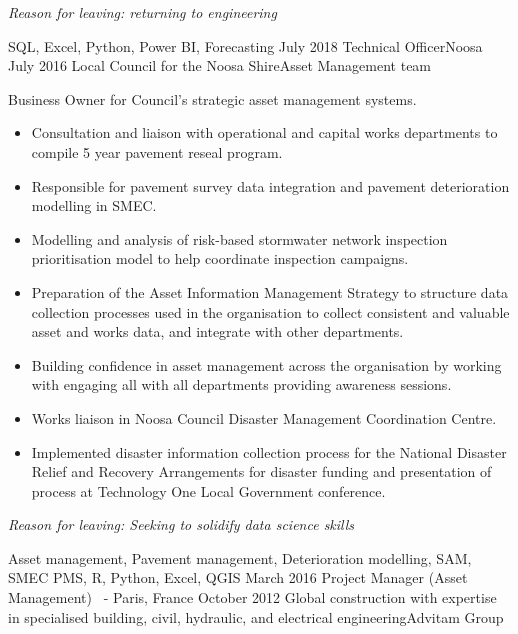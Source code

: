 \begin{experiences}
{\begin{itemize}
                      \end{itemize}
                     \textit{Reason for leaving: returning to engineering}  
                    }
                    {SQL, Excel, Python, Power BI, Forecasting}
  \emptySeparator
  \consultantexperience
    {July 2018} {Technical Officer}{}{Noosa}
    {July 2016}   {Local Council for the Noosa Shire}{Asset Management team}
      {Business Owner for Council's strategic asset management systems.
                      \begin{itemize}
		\item Consultation and liaison with operational and capital works departments to compile 5 year pavement reseal program.
		\item Responsible for pavement survey data integration and pavement deterioration modelling in SMEC.
		\item Modelling and analysis of risk-based stormwater network inspection prioritisation model to help coordinate inspection campaigns.
		\item Preparation of the Asset Information Management Strategy to structure data collection processes used in the organisation to collect consistent and valuable asset and works data, and integrate with other departments.
		\item Building confidence in asset management across the organisation by working with engaging all with all departments providing awareness sessions.
		\item Works liaison in Noosa Council Disaster Management Coordination Centre.
		\item Implemented disaster information collection process for the National Disaster Relief and Recovery Arrangements for disaster funding and presentation of process at Technology One Local Government conference.                                
                      \end{itemize}
                       \textit{Reason for leaving: Seeking to solidify data science skills}
                    }
                    {Asset management, Pavement management, Deterioration modelling, SAM, SMEC PMS, R, Python, Excel, QGIS}
  \emptySeparator
  \consultantexperience
    {March 2016}     {Project Manager (Asset Management)}{  \ - }{Paris, France}
    {October 2012}   {Global construction with expertise in specialised building, civil, hydraulic, and electrical engineering}{Advitam Group}

\end{experiences}
